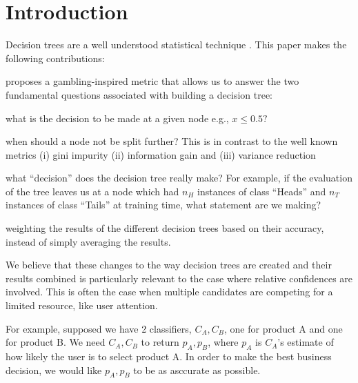 \newcommand{\extra}{0}

\section{Introduction}

Decision trees are a well understood statistical technique \cite{Hastie2009}.
This paper makes the following contributions:
\be
\item proposes a gambling-inspired metric that allows us to answer
the two fundamental questions associated with building a decision tree:
\be
\item what is the decision to be made at a given node e.g., \(x \leq 0.5?\)
\item when should a node not be split further?
\ee
This is in contrast to the well known metrics (i) gini impurity (ii) information
gain and (iii) variance reduction
\item what ``decision'' does the decision tree really make? For example, if the
evaluation of the tree leaves us at a node which had 
\(n_H\) instances of class ``Heads'' and 
\(n_T\) instances of class ``Tails'' at training time, what statement are we
making?
\item weighting the results of the different decision trees based 
on their accuracy, instead of simply averaging the results.
\ee

We believe that these changes to the way decision trees are created and their
results combined is particularly relevant to the case where relative
confidences are involved. This is often the case when multiple candidates are
competing for a limited resource, like user attention. 

For example, supposed we have 2 classifiers, \(C_A, C_B\), one for product A and one for
product B.  We need \(C_A, C_B\) to return \(p_A, p_B\), where \(p_A\) is
\(C_A\)'s estimate of how likely the user is to select product A. In order to
make the best business decision, we would like \(p_A, p_B\) to be as asccurate
as possible.


